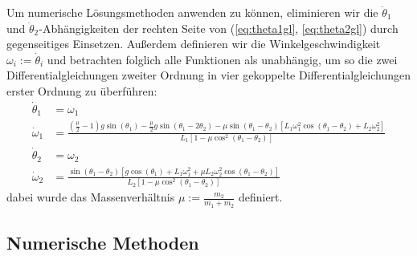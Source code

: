 \documentclass[10pt,a4paper]{article}
\begin{document}
Um numerische Lösungsmethoden anwenden zu können, eliminieren wir die $\ddot{\theta}_1$ und $\ddot{\theta}_2$-Abhängigkeiten der rechten Seite von (\ref{eq:theta1gl}, \ref{eq:theta2gl}) durch gegenseitiges Einsetzen. Außerdem definieren wir die Winkelgeschwindigkeit $\omega_i := \dot{\theta}_i$ und betrachten folglich alle Funktionen als unabhängig, um so die zwei Differentialgleichungen zweiter Ordnung in vier gekoppelte Differentialgleichungen erster Ordnung zu überführen:
\begin{align}
\dot{\theta}_1 &= \omega_1 \\
\dot{\omega}_1 &= \frac{\left(\frac{\mu}{2} - 1\right) g \sin(\theta_1) - \frac{\mu}{2} g \sin(\theta_1 - 2 \theta_2) - \mu \sin(\theta_1 - \theta_2)\left[ L_1 \omega_1^2 \cos(\theta_1 - \theta_2) + L_2 \omega_2^2 \right]}{L_1 \left[1 - \mu \cos^2(\theta_1 - \theta_2)\right]} \\
\dot{\theta}_2 &= \omega_2 \\
\dot{\omega}_2 &= \frac{\sin(\theta_1 - \theta_2) \left[ g \cos(\theta_1) + L_1 \omega_1^2 + \mu L_2 \omega_2^2 \cos(\theta_1 - \theta_2) \right]}{L_2 \left[1 - \mu \cos^2(\theta_1 - \theta_2)\right]}
\end{align}
dabei wurde das Massenverhältnis $\mu := \frac{m_2}{m_1 + m_2}$ definiert.

\subsection{Numerische Methoden}
\end{document}
